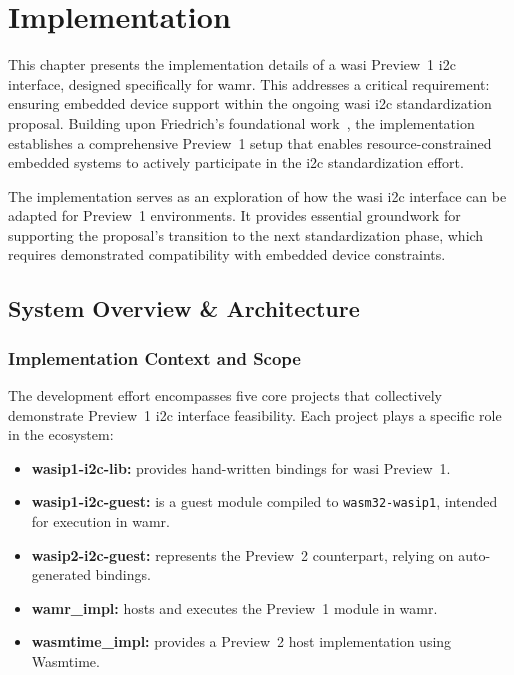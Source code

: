 \chapter{Implementation}
\label{chap:implementation}

This chapter presents the implementation details of a \acrshort{wasi} Preview~1 \acrshort{i2c} interface, designed specifically for \acrshort{wamr}. This addresses a critical requirement: ensuring embedded device support within the ongoing \acrshort{wasi} \acrshort{i2c} standardization proposal. Building upon Friedrich's foundational work~\cite{friedrich_paper, friedrich_impl}, the implementation establishes a comprehensive Preview~1 setup that enables resource-constrained embedded systems to actively participate in the \acrshort{i2c} standardization effort.

The implementation serves as an exploration of how the \acrshort{wasi} \acrshort{i2c} interface can be adapted for Preview~1 environments. It provides essential groundwork for supporting the proposal’s transition to the next standardization phase, which requires demonstrated compatibility with embedded device constraints.

\section{System Overview \& Architecture}
\label{sec:system-overview}

\subsection{Implementation Context and Scope}

The development effort encompasses five core projects that collectively demonstrate Preview~1 \acrshort{i2c} interface feasibility. Each project plays a specific role in the ecosystem:  
\begin{itemize}
    \item \textbf{wasip1-i2c-lib:} provides hand-written bindings for \acrshort{wasi} Preview~1.  
    \item \textbf{wasip1-i2c-guest:} is a guest module compiled to \texttt{wasm32-wasip1}, intended for execution in \acrshort{wamr}.  
    \item \textbf{wasip2-i2c-guest:} represents the Preview~2 counterpart, relying on auto-generated bindings.  
    \item \textbf{wamr\_impl:} hosts and executes the Preview~1 module in \acrshort{wamr}.  
    \item \textbf{wasmtime\_impl:} provides a Preview~2 host implementation using Wasmtime.
\end{itemize}

